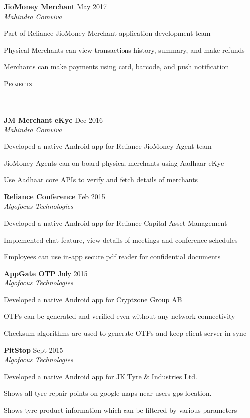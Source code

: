 \documentclass{article}
\newcommand{\header}[1]{{
\hspace*{-15pt}\vspace*{6pt} \textsc{#1}} \vspace*{-6pt} 
\lineunder
}
\newcommand{\lineunder}{
\vspace*{-8pt} \\ \hspace*{-18pt} 
\hrulefill \\
}
\newcommand{\project}[4]{{
\vspace*{2pt}%
\textbf{#1} #2 \hfill #3\\ \textit{#4} \vspace*{2pt}}
}
\renewcommand{\labelitemii}{
$\vcenter{\hbox{\tiny$\bullet$}}$\hspace*{-3pt}
}
\newenvironment{bullet-list-minor}{
\begin{list}{\labelitemii}{\setlength\leftmargin{15pt} 
\topsep 0pt \itemsep -2pt}}{\vspace*{4pt}\end{list}
}
\begin{document}
    \project{JioMoney Merchant}{}{May 2017}{Mahindra Comviva}
	\begin{bullet-list-minor}
	\item Part of Reliance JioMoney Merchant application development team 
	\item Physical Merchants can view transactions history, summary, and make refunds
	\item Merchants can make payments using card, barcode, and push notification
    \end{bullet-list-minor}

\newpage
\vspace*{-20pt}
\header{Projects}
    \project{JM Merchant eKyc}{}{Dec 2016}{Mahindra Comviva}
	\begin{bullet-list-minor}
	\item Developed a native Android app for Reliance JioMoney Agent team
	\item JioMoney Agents can on-board physical merchants using Aadhaar eKyc
	\item Use Aadhaar core APIs to verify and fetch details of merchants
    \end{bullet-list-minor}

    \project{Reliance Conference}{}{Feb 2015}{Algofocus Technologies}
	\begin{bullet-list-minor}
	\item Developed a native Android app for Reliance Capital Asset Management
    \item Implemented chat feature, view details of meetings and conference schedules
    \item Employees can use in-app secure pdf reader for confidential documents
    \end{bullet-list-minor}

    \project{AppGate OTP}{}{July 2015}{Algofocus Technologies}
	\begin{bullet-list-minor}
	\item Developed a native Android app for Cryptzone Group AB
	\item OTPs can be generated and verified even without any network connectivity
    \item Checksum algorithms are used to generate OTPs and keep client-server in sync
    \end{bullet-list-minor}

    \project{PitStop}{}{Sept 2015}{Algofocus Technologies}
	\begin{bullet-list-minor}
	\item Developed a native Android app for JK Tyre \& Industries Ltd.
	\item Shows all tyre repair points on google maps near users gps location.
	\item Shows tyre product information which can be filtered by various parameters 
	\end{bullet-list-minor}
\end{document}
